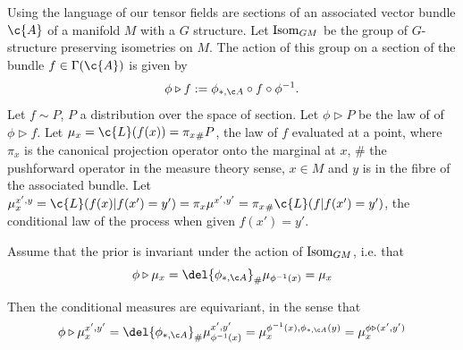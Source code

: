 \begin{theorem}
	\label{thm:equiv_posterior_maps}
	Using the language of \textcite{weiler2023equivariant} our tensor fields are sections of an associated vector bundle $\c{A}$ of a manifold $M$ with a $G$ structure.
	Let $\operatorname{Isom}_{GM}$ be the group of $G$-structure preserving isometries on $M$.
	The action of this group on a section of the bundle $f \in \Gamma(\c{A})$ is given by \[ \phi \triangleright f := \phiA \circ f \circ \phi^{-1}.\]
	Let $f \sim P$, $P$ a distribution over the space of section.
	Let $\phi \triangleright P$ be the law of of $\phi \triangleright f$.
	Let $\mu_x = \c{L}(f(x)) = {\pi_x}_\# P$, the law of $f$ evaluated at a point, where $\pi_x$ is the canonical projection operator onto the marginal at $x$, $\#$ the pushforward operator in the measure theory sense, $x\in M$ and $y$ is in the fibre of the associated bundle.
	Let $\mu_x^{x', y} = \c{L}(f(x) | f(x') = y') = {\pi_x} \mu^{x', y'} = {\pi_x}_{\#} \c{L}(f | f(x') = y')$, the conditional law of the process when given $f(x') = y'$.

	Assume that the prior is invariant under the action of $\operatorname{Isom}_{GM}$, i.e. that \[\phi \triangleright \mu_x = \del{\phiA}_\# \mu_{\phi^{-1}(x)} = \mu_x\] 

	Then the conditional measures are equivariant, in the sense that \[\phi \triangleright \mu_x^{x', y'} = \del{\phiA}_\#\mu_{\phi^{-1}(x)}^{x',y'} = \mu_x^{\phi^{-1}(x), \phiA(y)} = \mu_x^{\phi \triangleright (x', y')}\] 

\end{theorem} 

